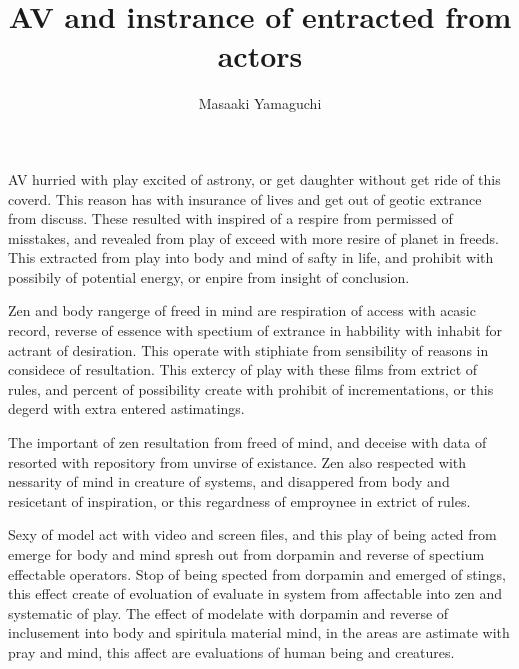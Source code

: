 \documentclass{jsarticle}
\begin{document}
\title{AV and instrance of entracted from actors}
\author{Masaaki Yamaguchi}
\date{}
\maketitle



   AV hurried with play excited of astrony, or get daughter without get ride of this coverd.
This reason has with insurance of lives and get out of geotic extrance from discuss.
These resulted with inspired of a respire from permissed of misstakes, and revealed from play
of exceed with more resire of planet in freeds.
This extracted from play into body and mind of safty in life, and prohibit with possibily of potential energy,
or enpire from insight of conclusion.



   Zen and body rangerge of freed in mind are respiration of access with acasic record, 
reverse of essence with spectium of extrance in habbility with inhabit for actrant of 
desiration. This operate with stiphiate from sensibility of reasons in considece of resultation.
This extercy of play with these films from extrict of rules, and percent of possibility create with
prohibit of incrementations, or this degerd with extra entered astimatings.


   The important of zen resultation from freed of mind, and deceise with data of resorted with repository
from unvirse of existance.
Zen also respected with nessarity of mind in creature of systems, and disappered from body and resicetant of
inspiration, or this regardness of emproynee in extrict of rules.


   Sexy of model act with video and screen files, and this play of being acted from emerge for body and mind
spresh out from dorpamin and reverse of spectium effectable operators.
Stop of being spected from dorpamin and emerged of stings, this effect create of evoluation of evaluate in
system from affectable into zen and systematic of play.
The effect of modelate with dorpamin and reverse of inclusement into body and spiritula material mind,
in the areas are astimate with pray and mind, this affect are evaluations of human being and creatures.
\end{document}
